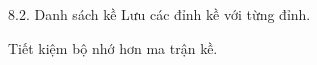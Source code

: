 \documentclass{beamer}
\begin{document}
\begin{frame}{8.2. Danh sách kề}
\Large
Lưu các đỉnh kề với từng đỉnh.

\vspace{0.3cm}
Tiết kiệm bộ nhớ hơn ma trận kề.
\end{frame}
\end{document}
